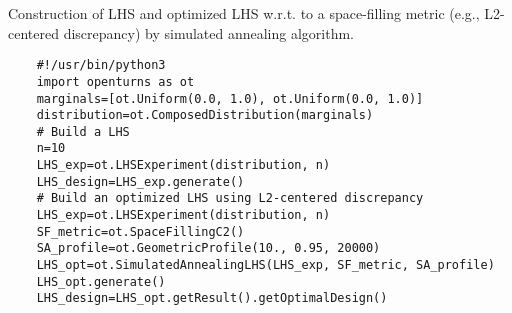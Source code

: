 \begin{otexample_apx}
    Construction of LHS and optimized LHS w.r.t. to a space-filling metric (e.g., L2-centered discrepancy) by simulated annealing algorithm. 
    \lstset{style=mystyle, language=python}
%
\begin{lstlisting}
    #!/usr/bin/python3
    import openturns as ot
    marginals=[ot.Uniform(0.0, 1.0), ot.Uniform(0.0, 1.0)]
    distribution=ot.ComposedDistribution(marginals)
    # Build a LHS
    n=10
    LHS_exp=ot.LHSExperiment(distribution, n)
    LHS_design=LHS_exp.generate()
    # Build an optimized LHS using L2-centered discrepancy
    LHS_exp=ot.LHSExperiment(distribution, n)
    SF_metric=ot.SpaceFillingC2()
    SA_profile=ot.GeometricProfile(10., 0.95, 20000)
    LHS_opt=ot.SimulatedAnnealingLHS(LHS_exp, SF_metric, SA_profile)
    LHS_opt.generate()
    LHS_design=LHS_opt.getResult().getOptimalDesign()
\end{lstlisting}
%
\end{otexample_apx}

